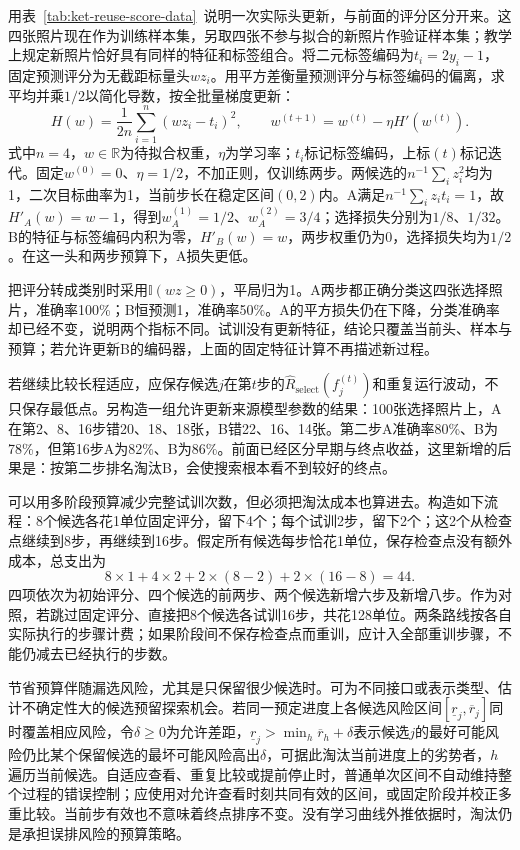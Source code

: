 用表~\ref{tab:ket-reuse-score-data}~说明一次实际头更新，与前面的评分区分开来。这四张照片现在作为训练样本集，另取四张不参与拟合的新照片作验证样本集；教学上规定新照片恰好具有同样的特征和标签组合。将二元标签编码为$t_i=2y_i-1$，固定预测评分为无截距标量头$wz_i$。用平方差衡量预测评分与标签编码的偏离，求平均并乘$1/2$以简化导数，按全批量梯度更新：
\begin{equation}
  H(w)=\frac{1}{2n}\sum_{i=1}^{n}(wz_i-t_i)^2,
  \qquad
  w^{(t+1)}=w^{(t)}-\eta H'(w^{(t)}).
  \label{eq:ket-reuse-trial-update}
\end{equation}
式中$n=4$，$w\in\mathbb R$为待拟合权重，$\eta$为学习率；$t_i$标记标签编码，上标$(t)$标记迭代。固定$w^{(0)}=0$、$\eta=1/2$，不加正则，仅训练两步。两候选的$n^{-1}\sum_i z_i^2$均为1，二次目标曲率为1，当前步长在稳定区间$(0,2)$内。A满足$n^{-1}\sum_i z_it_i=1$，故$H'_A(w)=w-1$，得到$w_A^{(1)}=1/2$、$w_A^{(2)}=3/4$；选择损失分别为$1/8$、$1/32$。B的特征与标签编码内积为零，$H'_B(w)=w$，两步权重仍为0，选择损失均为$1/2$。在这一头和两步预算下，A损失更低。

把评分转成类别时采用$\mathbb I(wz\geq0)$，平局归为1。A两步都正确分类这四张选择照片，准确率100\%；B恒预测1，准确率50\%。A的平方损失仍在下降，分类准确率却已经不变，说明两个指标不同。试训没有更新特征，结论只覆盖当前头、样本与预算；若允许更新B的编码器，上面的固定特征计算不再描述新过程。

若继续比较长程适应，应保存候选$j$在第$t$步的$\hat R_{\mathrm{select}}(f_j^{(t)})$和重复运行波动，不只保存最低点。另构造一组允许更新来源模型参数的结果：100张选择照片上，A在第2、8、16步错20、18、18张，B错22、16、14张。第二步A准确率80\%、B为78\%，但第16步A为82\%、B为86\%。前面已经区分早期与终点收益，这里新增的后果是：按第二步排名淘汰B，会使搜索根本看不到较好的终点。

可以用多阶段预算减少完整试训次数，但必须把淘汰成本也算进去。构造如下流程：8个候选各花1单位固定评分，留下4个；每个试训2步，留下2个；这2个从检查点继续到8步，再继续到16步。假定所有候选每步恰花1单位，保存检查点没有额外成本，总支出为
\[
  8\times1+4\times2+2\times(8-2)+2\times(16-8)
  =44.
\]
四项依次为初始评分、四个候选的前两步、两个候选新增六步及新增八步。作为对照，若跳过固定评分、直接把8个候选各试训16步，共花128单位。两条路线按各自实际执行的步骤计费；如果阶段间不保存检查点而重训，应计入全部重训步骤，不能仍减去已经执行的步数。

节省预算伴随漏选风险，尤其是只保留很少候选时。可为不同接口或表示类型、估计不确定性大的候选预留探索机会。若同一预定进度上各候选风险区间$[\underline r_j,\overline r_j]$同时覆盖相应风险，令$\delta\geq0$为允许差距，$\underline r_j>\min_h\overline r_h+\delta$表示候选$j$的最好可能风险仍比某个保留候选的最坏可能风险高出$\delta$，可据此淘汰当前进度上的劣势者，$h$遍历当前候选。自适应查看、重复比较或提前停止时，普通单次区间不自动维持整个过程的错误控制；应使用对允许查看时刻共同有效的区间，或固定阶段并校正多重比较。当前步有效也不意味着终点排序不变。没有学习曲线外推依据时，淘汰仍是承担误排风险的预算策略。

